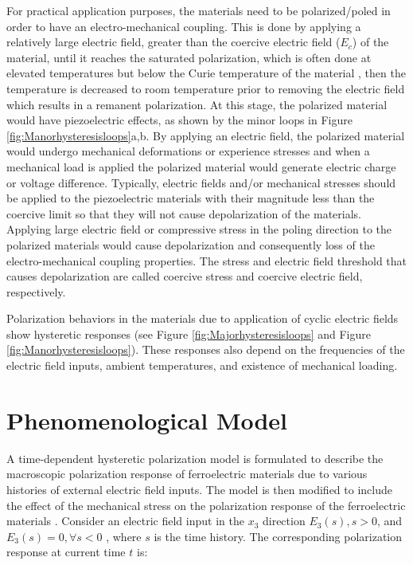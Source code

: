 For practical application purposes, the materials need to be polarized/poled in order to have an electro-mechanical coupling. 
This is done by applying a relatively large electric field, greater than the coercive electric field ($E_c$) of the material,
 until it reaches the saturated polarization,
  which is often done at elevated temperatures but below the Curie temperature of the material \cite{Lines1977},
   then the temperature is decreased to room temperature prior to removing the electric field which results in a remanent polarization. 
At this stage, the polarized material would have piezoelectric effects, as shown by the minor loops in Figure \ref{fig:Manorhysteresisloops}a,b. 
By applying an electric field, the polarized material would undergo mechanical deformations or experience stresses and when a mechanical load is applied the polarized material would generate electric charge or voltage difference. 
Typically, electric fields and/or mechanical stresses should be applied to the piezoelectric materials with their magnitude less than the coercive limit so that they will not cause depolarization of the materials. 
Applying large electric field or compressive stress in the poling direction to the polarized materials would cause depolarization and  consequently loss of the electro-mechanical coupling properties. 
The stress and electric field threshold that causes depolarization are called coercive stress and coercive electric field, respectively\cite{Sohrabi201344}.

Polarization behaviors in the materials due to application of cyclic electric fields show hysteretic responses (see Figure \ref{fig:Majorhysteresisloops} and Figure \ref{fig:Manorhysteresisloops}). 
These responses also depend on the frequencies of the electric field inputs, ambient temperatures, and existence of mechanical loading. 

\section{Phenomenological Model}
A time-dependent hysteretic polarization model is formulated to describe the macroscopic polarization response of ferroelectric materials
 due to various histories of external electric field inputs. 
The model is then modified to include the effect of the mechanical stress on the
 polarization response of the ferroelectric materials \cite{Muliana2011,Sohrabi201344}.
Consider an electric field input in the $x_3$ direction $E_3(s),s>0$,  and $E_3(s)=0,\forall s<0$  , where $s$ is the time history.  
The corresponding polarization response at current time $t$ is:

